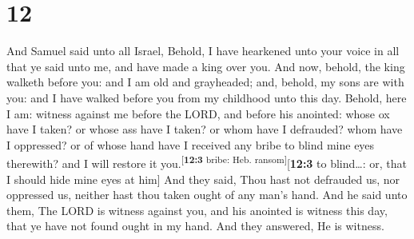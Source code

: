 \hypertarget{section-11}{%
\section{12}\label{section-11}}

 And Samuel said unto all Israel, Behold, I have hearkened
unto your voice in all that ye said unto me, and have made a king over
you.  And now, behold, the king walketh before you: and I
am old and grayheaded; and, behold, my sons are with you: and I have
walked before you from my childhood unto this day. 
Behold, here I am: witness against me before the LORD, and before his
anointed: whose ox have I taken? or whose ass have I taken? or whom have
I defrauded? whom have I oppressed? or of whose hand have I received any
bribe to blind mine eyes therewith? and I will restore it
you.\textsuperscript{{[}\textbf{12:3} bribe: Heb.
ransom{]}}{[}\textbf{12:3} to blind\ldots: or, that I should hide mine
eyes at him{]}  And they said, Thou hast not defrauded us,
nor oppressed us, neither hast thou taken ought of any man's hand.
 And he said unto them, The LORD is witness against you,
and his anointed is witness this day, that ye have not found ought in my
hand. And they answered, He is witness.


